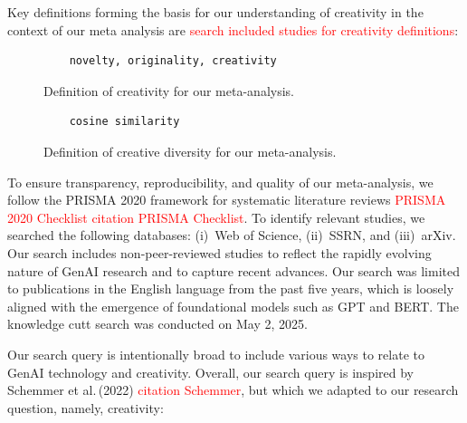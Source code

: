 \documentclass[manuscript, screen, review, acmsmall, anonymous]{acmart}
\newcommand{\TODO}[1]{\textcolor{red}{#1}}
\begin{document}
Key definitions forming the basis for our understanding of creativity in the context of our meta analysis are \TODO{search included studies for creativity definitions}: 
\begin{figure}[h!]
    \label{fig:earch-query}
  \centering
  \begin{tcolorbox}[
    enhanced,
    breakable,
    center upper, 
    colback=gray!10,
    colframe=gray!60!black,
    boxrule=0.8pt,
    arc=4pt,
    outer arc=4pt,
    drop shadow={black!50!white,opacity=0.3},
    width=\textwidth,
    title=\textbf{Creativity}
  ]
    \begin{verbatim}
    novelty, originality, creativity
    \end{verbatim}
  \end{tcolorbox}
  \caption{Definition of creativity for our meta-analysis.}
  \label{fig:search-query}
\end{figure}
\begin{figure}[h!]
    \label{fig:earch-query}
  \centering
  \begin{tcolorbox}[
    enhanced,
    breakable,
    center upper, 
    colback=gray!10,
    colframe=gray!60!black,
    boxrule=0.8pt,
    arc=4pt,
    outer arc=4pt,
    drop shadow={black!50!white,opacity=0.3},
    width=\textwidth,
    title=\textbf{Creative diversity}
  ]
    \begin{verbatim}
    cosine similarity
    \end{verbatim}
  \end{tcolorbox}
  \caption{Definition of creative diversity for our meta-analysis.}
  \label{fig:search-query}
\end{figure}
    
    

To ensure transparency, reproducibility, and quality of our meta-analysis, we follow the PRISMA 2020 framework for systematic literature reviews \TODO{PRISMA 2020 Checklist} \TODO{citation PRISMA Checklist}. To identify relevant studies, we searched the following databases: (i)~Web of Science, (ii)~SSRN, and (iii)~arXiv. Our search includes non-peer-reviewed studies to reflect the rapidly evolving nature of GenAI research and to capture recent advances. Our search was limited to publications in the English language from the past five years, which is loosely aligned with the emergence of foundational models such as GPT and BERT. The knowledge cutt search was conducted on May 2, 2025.

Our search query is intentionally broad to include various ways to relate to GenAI technology and creativity. Overall, our search query is inspired by Schemmer et al.\,(2022) \cite{Schemmer2022} \TODO{citation Schemmer}, but which we adapted to our research question, namely, creativity:
\end{document}
